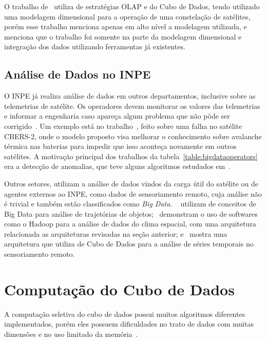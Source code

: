 O trabalho de~\cite{yvernesCopernicusGroundSegment2018} utiliza de estratégias OLAP e do Cubo de Dados, tendo utilizado uma modelagem dimensional para a operação de uma constelação de satélites, porém esse trabalho menciona apenas em alto nível a modelagem utilizada, e menciona que o trabalho foi somente na parte da modelagem dimensional e integração dos dados utilizando ferramentas já existentes.

\subsection{Análise de Dados no INPE}\label{ch:corr:inpe}

O INPE já realiza análise de dados em outros departamentos, inclusive sobre as telemetrias de satélite.
Os operadores devem monitorar os valores das telemetrias e informar a engenharia caso apareça algum problema que não pôde ser corrigido~\cite{TominagaFerrAmbr:2017:CoSaTe}.
Um exemplo está no trabalho~\cite{Magalhaes:2012:EsAvTe}, feito sobre uma falha no satélite CBERS-2, onde o modelo proposto visa melhorar o conhecimento sobre avalanche térmica nas baterias para impedir que isso aconteça novamente em outros satélites.
A motivação principal dos trabalhos da tabela~\ref{table:bigdataoperators} era a detecção de anomalias, que teve alguns algoritmos estudados em~\cite{AzevedoAmbrViei::EsSoTe}.

Outros setores, utilizam a análise de dados vindos da carga útil do satélite ou de agentes externos ao INPE, como dados de sensoriamento remoto, cuja análise não é trivial e também estão classificados como \textit{Big Data}.
~ utilizam de conceitos de Big Data para análise de trajetórias de objetos;~ demonstram o uso de softwares como o Hadoop para a análise de dados do clima espacial, com uma arquitetura relacionada as arquiteturas revisadas na seção anterior; e~ mostra uma arquitetura que utiliza de Cubo de Dados para a análise de séries temporais no sensoriamento remoto.

\section{Computação do Cubo de Dados}\label{ch:corr:cube}

A computação seletiva do cubo de dados possui muitos algoritmos diferentes implementados, porém eles possuem dificuldades no trato de dados com muitas dimensões e no uso limitado da memória~\cite{hanDataMiningConcepts2011}.

